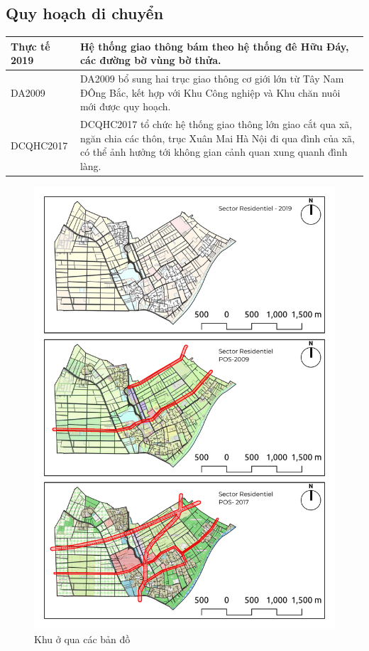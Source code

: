 \documentclass[../thesis.tex]{subfiles}
\begin{document}
\subsection {Quy hoạch di chuyển}
\begin{table}
\centering
\begin{tabular}{ | m{3cm} | m{12cm}| } 
\hline  
Thực tế 2019 & Hệ thống giao thông bám theo hệ thống đê Hữu Đáy, các đường bờ vùng bờ thửa. \\
\hline 
DA2009 & DA2009 bổ sung hai trục giao thông cơ giới lớn từ Tây Nam ĐÔng Bắc, kết hợp với Khu Công nghiệp và Khu chăn nuôi mới được quy hoạch.
\\
\hline 
DCQHC2017 & DCQHC2017 tổ chức hệ thống giao thông lớn giao cắt qua xã, ngăn chia các thôn, trục Xuân Mai Hà Nội đi qua đình của xã, có thể ảnh hưởng tới không gian cảnh quan xung quanh đình làng.\\
\hline 
\end{tabular}
\end{table}
\begin{figure}\caption{Khu ở qua các bản đồ}\includegraphics[width=15cm]{Graphic/TC3.jpg}\end{figure}
\clearpage
\end{document}
